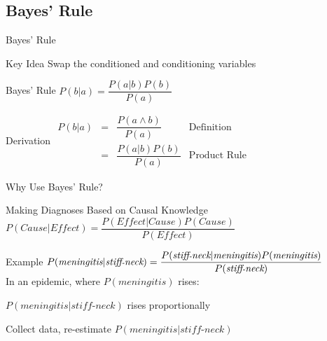 \documentclass[14pt]{beamer}
\begin{document}
\subsection{Bayes' Rule}


\begin{frame}{Bayes' Rule}
\begin{block}{Key Idea}
Swap the conditioned and conditioning variables
\end{block}
\begin{block}{Bayes' Rule}
\tab $P(b|a) = \dfrac{P(a|b)P(b)}{P(a)}$
\end{block}
\pause
\begin{block}{Derivation}
$
\begin{array}{llll}
P(b|a)
& = & \dfrac{P(a \land b)} {P(a)} & \mbox{Definition} \\[1em]
& = & \dfrac{P(a|b)P(b)} {P(a)} & \mbox{Product Rule}
\end{array}
$
\end{block}
\end{frame}

\begin{frame}{Why Use Bayes' Rule?}
\begin{block}{Making Diagnoses Based on Causal Knowledge}
$
P(\textit{Cause}|\textit{Effect}) =
\dfrac{P(\textit{Effect}|\textit{Cause})P(\textit{Cause})}{P(\textit{Effect})}
$
\end{block}
\pause
\begin{block}{Example}
{\small$
P(\textit{meningitis}|\textit{stiff{\scriptsize -}neck}) = 
\dfrac{P(\textit{stiff{\scriptsize -}neck}|\textit{meningitis})P(\textit{meningitis})}{P(\textit{stiff{\scriptsize -}neck})}
$}
\\[1em]
\pause
In an epidemic, where $P(\textit{meningitis})$ rises:
\begin{description}[+Bayes]
\item[+Bayes] $P(\textit{meningitis}|\textit{stiff-neck})$ rises proportionally
\item[-Bayes] Collect data, re-estimate $P(\textit{meningitis}|\textit{stiff-neck})$
\end{description}
\end{block}
\end{frame}
\end{document}
